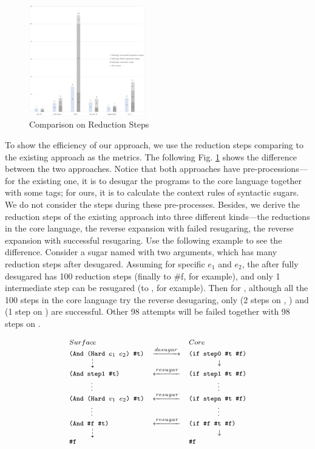 \begin{figure}[t]
	\centering
	\includegraphics[width=0.45\textwidth]{images/efficiency.png}
	\caption{Comparison on Reduction Steps}
	\label{fig:step}
\end{figure}
To show the efficiency of our approach, we use the reduction steps comparing to the existing approach as the metrics. The following Fig. \ref{fig:step} shows the difference between the two approaches. Notice that both approaches have pre-processions---for the existing one, it is to desugar the programs to the core language together with some tags; for ours, it is to calculate the context rules of syntactic sugars. We do not consider the steps during these pre-processes. Besides, we derive the reduction steps of the existing approach into three different kinds---the reductions in the core language, the reverse expansion with failed resugaring, the reverse expansion with successful resugaring.  Use the following example to see the difference. Consider a sugar named  with two arguments, which has many reduction steps after desugared. Assuming for specific $e_1$ and $e_2$, the  after fully desugared has 100 reduction steps (finally to \#f, for example), and only 1 intermediate step can be resugared (to , for example). Then for , although all the 100 steps in the core language try the reverse desugaring, only  (2 steps on , ) and  (1 step on ) are successful. Other 98 attempts will be failed together with 98 steps on .

\[
{\footnotesize
	\begin{array}{lcl}
	Surface&&Core\\
	\Code{(And (Hard $e_1$ $e_2$) \#t)}&\xrightarrow{desugar}&\Code{(if step0 \#t \#f)}\\
	\qquad\quad\dashdownarrow& &\qquad\qquad\downarrow\\
	\Code{(And step1 \#t)}&\xleftarrow{resugar}&\Code{(if step1 \#t \#f)}\\
	\qquad\quad\vdots& &\qquad\qquad\vdots\\
	\Code{(And (Hard $v_1$ $e_2$) \#t)}&\xleftarrow{resugar}&\Code{(if stepn \#t \#f)}\\
	\qquad\quad\vdots& &\qquad\qquad\vdots\\
	\Code{(And \#f \#t)}&\xleftarrow{resugar}& \Code{(if \#f \#t \#f)}\\
	\qquad\quad\dashdownarrow& &\qquad\qquad\downarrow\\
	\Code{\#f}&& \Code{\#f}\\
\end{array}
}
\]


